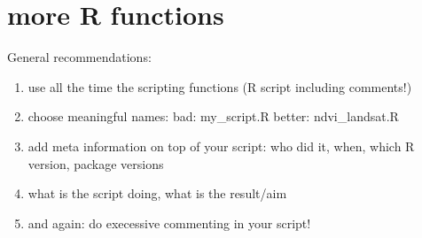 % 



\section{more R functions}

{
}


\begin{frame}{General recommendations:}
 
      \begin{enumerate}[<+->]
	\item use all the time the scripting functions (R script including comments!)
	\item choose meaningful names: bad: my\_script.R better: ndvi\_landsat.R
	\item add meta information on top of your script: who did it, when, which R version, package versions
	\item what is the script doing, what is the result/aim
	\item and again: do execessive commenting in your script!
      \end{enumerate}

\end{frame}


